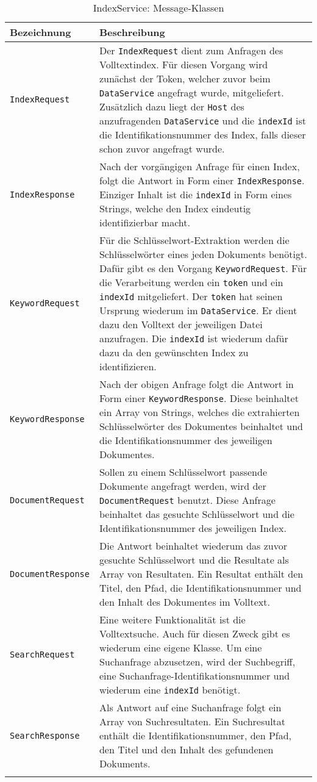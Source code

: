 \begin{longtable}{|p{4cm}| p{8cm}|}
  \hline
    \textbf{Bezeichnung} & \textbf{Beschreibung}\\\hline
    \texttt{IndexRequest} & Der \texttt{IndexRequest} dient zum Anfragen des Volltextindex. Für diesen Vorgang wird zunächst der \gls{Token}, welcher zuvor beim \texttt{DataService} angefragt wurde, mitgeliefert. Zusätzlich dazu liegt der \texttt{Host} des anzufragenden \texttt{DataService} und die \texttt{indexId} ist die Identifikationsnummer des Index, falls dieser schon zuvor angefragt wurde.\\\hline
    \texttt{IndexResponse} & Nach der vorgängigen Anfrage für einen Index, folgt die Antwort in Form einer \texttt{IndexResponse}. Einziger Inhalt ist die \texttt{indexId} in Form eines Strings, welche den Index eindeutig identifizierbar macht.\\\hline
    \texttt{KeywordRequest} & Für die Schlüsselwort-Extraktion werden die Schlüsselwörter eines jeden Dokuments benötigt. Dafür gibt es den Vorgang \texttt{KeywordRequest}. Für die Verarbeitung werden ein \texttt{token} und ein \texttt{indexId} mitgeliefert. Der \texttt{token} hat seinen Ursprung wiederum im \texttt{DataService}. Er dient dazu den Volltext der jeweiligen Datei anzufragen. Die \texttt{indexId} ist wiederum dafür dazu da den gewünschten Index zu identifizieren.\\\hline
    \texttt{KeywordResponse} & Nach der obigen Anfrage folgt die Antwort in Form einer \texttt{KeywordResponse}. Diese beinhaltet ein Array von Strings, welches die extrahierten Schlüsselwörter des Dokumentes beinhaltet und die Identifikationsnummer des jeweiligen Dokumentes.\\\hline
    \texttt{DocumentRequest} & Sollen zu einem Schlüsselwort passende Dokumente angefragt werden, wird der \texttt{DocumentRequest} benutzt. Diese Anfrage beinhaltet das gesuchte Schlüsselwort und die Identifikationsnummer des jeweiligen Index.\\\hline
    \texttt{DocumentResponse} & Die Antwort beinhaltet wiederum das zuvor gesuchte Schlüsselwort und die Resultate als Array von Resultaten. Ein Resultat enthält den Titel, den Pfad, die Identifikationsnummer und den Inhalt des Dokumentes im Volltext.\\\hline
    \texttt{SearchRequest} & Eine weitere Funktionalität ist die Volltextsuche. Auch für diesen Zweck gibt es wiederum eine eigene Klasse. Um eine Suchanfrage abzusetzen, wird der Suchbegriff, eine Suchanfrage-Identifikationsnummer und wiederum eine \texttt{indexId} benötigt.\\\hline
    \texttt{SearchResponse} & Als Antwort auf eine Suchanfrage folgt ein Array von Suchresultaten. Ein Suchresultat enthält die Identifikationsnummer, den Pfad, den Titel und den Inhalt des gefundenen Dokuments.\\\hline
        \caption{IndexService: Message-Klassen}
    \label{indexservice-bodies}
\end{longtable}

